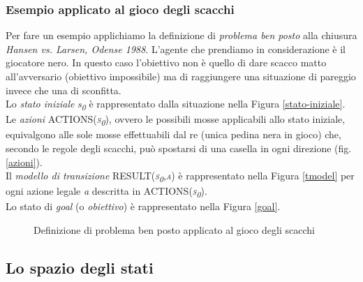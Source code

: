 \subsubsection*{Esempio applicato al gioco degli scacchi}
Per fare un esempio applichiamo la definizione di \emph{problema ben posto} alla chiusura \emph{Hansen vs. Larsen, Odense 1988}.
L'agente che prendiamo in considerazione è il giocatore nero.
In questo caso l'obiettivo non è quello di dare scacco matto all'avversario (obiettivo impossibile) ma di raggiungere una situazione di pareggio invece che una di sconfitta.\\
Lo \emph{stato iniziale} \emph{s\textsubscript{0}} è rappresentato dalla situazione nella Figura \ref{stato-iniziale}.\\
Le \emph{azioni} \textsc{ACTIONS(\emph{s\textsubscript{0}})}, ovvero le possibili mosse applicabili allo stato iniziale, equivalgono alle sole mosse effettuabili dal re (unica pedina nera in gioco) che, secondo le regole degli scacchi, può spostarsi di una casella in ogni direzione (fig. \ref{azioni}).\\
Il \emph{modello di transizione} \textsc{RESULT(\emph{s\textsubscript{0}},\emph{a})} è rappresentato nella Figura \ref{tmodel} per ogni azione legale \emph{a} descritta in \textsc{ACTIONS(\emph{s\textsubscript{0}})}.\\
Lo stato di \emph{goal} (o \emph{obiettivo}) è rappresentato nella Figura \ref{goal}.
\begin{figure}[!htb]
\centering
{}


\caption{Definizione di problema ben posto applicato al gioco degli scacchi}
\label{fig:scacchi-ben-posti}
\end{figure}







\subsection{Lo spazio degli stati}

